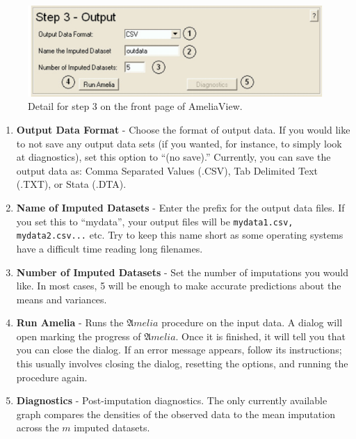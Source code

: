 \documentclass[12pt,titlepage]{article}
\begin{document}
\begin{figure}[ht]
  \centering \includegraphics[scale=.75]{step3}
  \caption{Detail for step 3 on the front page of AmeliaView.}
\end{figure}
\begin{enumerate}
\item \textbf{Output Data Format} - Choose the format of output data.
  If you would like to not save any output data sets (if you wanted,
  for instance, to simply look at diagnostics), set this option to
  ``(no save).''  Currently, you can save the output data as: Comma
  Separated Values (.CSV), Tab Delimited Text (.TXT), or Stata (.DTA).
\item \textbf{Name of Imputed Datasets} - Enter the prefix for the
  output data files.  If you set this to ``mydata'', your output files
  will be \texttt{mydata1.csv, mydata2.csv...} etc.  Try to keep this
  name short as some operating systems have a difficult time reading
  long filenames.
\item \textbf{Number of Imputed Datasets} - Set the number of
  imputations you would like.  In most cases, 5 will be enough to make
  accurate predictions about the means and variances.
\item \textbf{Run Amelia} - Runs the ${\mathfrak Amelia}$ procedure on
  the input data.  A dialog will open marking the progress of
  ${\mathfrak Amelia}$.  Once it is finished, it will tell you that
  you can close the dialog.  If an error message appears, follow its
  instructions; this usually involves closing the dialog, resetting
  the options, and running the procedure again.
\item \textbf{Diagnostics} - Post-imputation diagnostics.  The only
  currently available graph compares the densities of the observed
  data to the mean imputation across the $m$ imputed datasets.
\end{enumerate}
\end{document}
